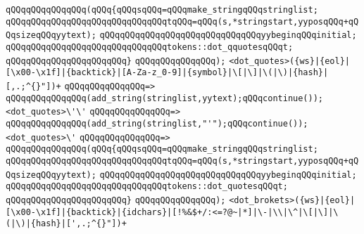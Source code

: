 \verb|qQQqqQQqqQQqqQQq(qQQq{qQQqsqQQq=qQQqmake_stringqQQqstringlist;|\newline
\verb|qQQqqQQqqQQqqQQqqQQqqQQqqQQqqQQqtqQQq=qQQq(s,*stringstart,yyposqQQq+qQQqsizeqQQqyytext);|\newline
\verb|qQQqqQQqqQQqqQQqqQQqqQQqqQQqqQQqyybeginqQQqinitial;|\newline
\verb|qQQqqQQqqQQqqQQqqQQqqQQqqQQqqQQqtokens::dot_qquotesqQQqt;|\newline
\verb|qQQqqQQqqQQqqQQqqQQqqQQq}|\newline
\verb|qQQqqQQqqQQqqQQq);|\newline
\newline
\newline
\newline
\verb|<dot_quotes>({ws}|\verb#|{eol}|[\x00-\x1f]|{backtick}|[A-Za-z_0-9]|{symbol}|\[|\]|\(|\)|{hash}|[,.;^{}"])+#\newline
\verb|qQQqqQQqqQQqqQQq=>|\newline
\verb|qQQqqQQqqQQqqQQq(add_string(stringlist,yytext);qQQqcontinue());|\newline
\newline
\verb|<dot_quotes>\'\'|\newline
\verb|qQQqqQQqqQQqqQQq=>|\newline
\verb|qQQqqQQqqQQqqQQq(add_string(stringlist,"'");qQQqcontinue());|\newline
\newline
\verb|<dot_quotes>\'|\newline
\verb|qQQqqQQqqQQqqQQq=>|\newline
\verb|qQQqqQQqqQQqqQQq(qQQq{qQQqsqQQq=qQQqmake_stringqQQqstringlist;|\newline
\verb|qQQqqQQqqQQqqQQqqQQqqQQqqQQqqQQqtqQQq=qQQq(s,*stringstart,yyposqQQq+qQQqsizeqQQqyytext);|\newline
\verb|qQQqqQQqqQQqqQQqqQQqqQQqqQQqqQQqyybeginqQQqinitial;|\newline
\verb|qQQqqQQqqQQqqQQqqQQqqQQqqQQqqQQqtokens::dot_quotesqQQqt;|\newline
\verb|qQQqqQQqqQQqqQQqqQQqqQQq}|\newline
\verb|qQQqqQQqqQQqqQQq);|\newline
\newline
\newline
\newline
\verb|<dot_brokets>({ws}|\verb#|{eol}|[\x00-\x1f]|{backtick}|{idchars}|[!%&$+/:<=?@~|*]|\-|\\|\^|\[|\]|\(|\)|{hash}|[',.;^{}"])+#\newline
